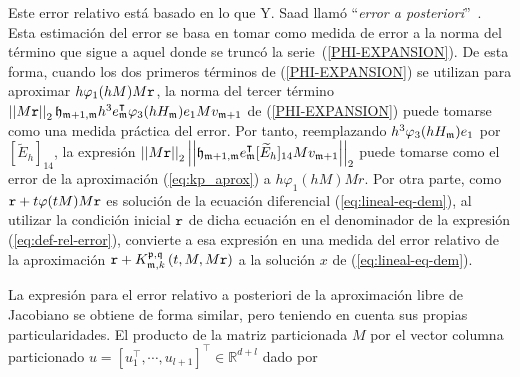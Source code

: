 Este error relativo está basado en lo que Y. Saad llamó ``\textit{error a posteriori}''~\cite{Saad92}. Esta estimación del error se basa en tomar como medida
de error a la norma del término que sigue a aquel donde se truncó la serie~(\ref{PHI-EXPANSION}). De esta forma, cuando los dos primeros términos de (\ref{PHI-EXPANSION}) se utilizan para aproximar $h\varphi_1(hM)M\mathtt{r}$, la norma del tercer término $\left\lvert\left\lvert M\mathtt{r} \right\rvert\right\rvert_2 \mathfrak{h}_{\mathfrak{m}+1,\mathfrak{m}} h^{3} e_{\mathfrak{m}}^\intercal\varphi_3( h H_{\mathfrak{m}})e_1 M v_{\mathfrak{m}+1} $ de (\ref{PHI-EXPANSION}) puede tomarse como una medida práctica del error. Por tanto, reemplazando $h^3\varphi_3( h H_{\mathfrak{m}})e_1$ por $[\widetilde{E}_{h}]_{14}$, la expresión $\left\lvert \left\lvert M\mathtt{r} \right\rvert\right\rvert_2 \left\lvert\left\lvert \mathfrak{h}_{\mathfrak{m}+1,\mathfrak{m}} e_{\mathfrak{m}}^\intercal[\widetilde{E}_{h}]_{14} M v_{\mathfrak{m}+1} \right\rvert\right\rvert_2$ puede tomarse como el error de la aproximación (\ref{eq:kp_aprox}) a $h\varphi_1(h M)Mr$. Por otra parte, como $\mathtt{r}+t\varphi(tM)M\mathtt{r}$ es solución de la ecuación diferencial (\ref{eq:lineal-eq-dem}), al utilizar la condición inicial $\mathtt{r}$ de dicha ecuación en el denominador de la expresión (\ref{eq:def-rel-error}), convierte a esa expresión en una medida del error relativo de la aproximación $\mathtt{r}+ K_{\mathfrak{m},k}^{\mathfrak{p},\mathfrak{q}}\left(t, M, M\mathtt{r} \right)$ a la solución $x$ de (\ref{eq:lineal-eq-dem}).

La expresión para el error relativo a posteriori de la aproximación libre de Jacobiano se obtiene de forma similar, pero teniendo en cuenta sus propias particularidades. El producto de la matriz particionada $M$ por el vector columna particionado $u=[u_1^\intercal,\cdots , u_{l+1}]^\intercal \in \mathbb{R}^{d+l}$ dado por


